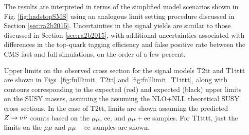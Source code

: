 The results are interpreted in terms of the simplified model scenarios shown in Fig. \ref{fig:hadstopSMS} using an analogous limit setting procedure discussed in Section \ref{sec:ra2b2015}. Uncertainties in the signal yields are similar to those discussed in Section \ref{sec:ra2b2015}, with additional uncertainties associated with differences in the top-quark tagging efficiency and false positive rate between the CMS fast and full simulations, on the order of a few percent.


Upper limits on the observed cross section for the signal models T2tt and T1tttt are shown in Figs. \ref{fig:fulllimit_T2tt} and \ref{fig:fulllimit_T1tttt}, along with contours corresponding to the expected (red) and expected (black) upper limits on the SUSY masses, assuming the assuming the NLO+NLL theoretical SUSY cross sections. In the case of T2tt, limits are shown assuming the predicted $Z\rightarrow \nu\bar{\nu}$ counts based on the $\mu\mu$, ee, and $\mu\mu+$ee samples. For T1tttt, just the limits on the $\mu\mu$ and $\mu\mu+$ee samples are shown. 

